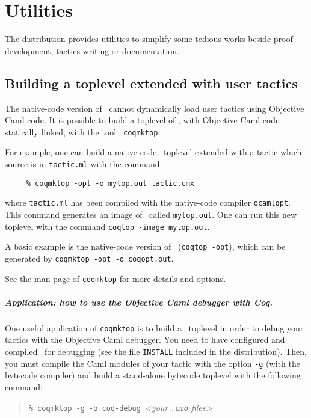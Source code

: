 \chapter{Utilities}\label{Utilities}

The distribution provides utilities to simplify some tedious works
beside proof development, tactics writing or documentation.

\section{Building a toplevel extended with user tactics}
\label{Coqmktop}

The native-code version of \Coq\ cannot dynamically load user tactics
using Objective Caml code. It is possible to build a toplevel of \Coq,
with Objective Caml code statically linked, with the tool {\tt
  coqmktop}.

For example, one can build a native-code \Coq\ toplevel extended with a tactic
which source is in {\tt tactic.ml} with the command 
\begin{verbatim}
     % coqmktop -opt -o mytop.out tactic.cmx
\end{verbatim}
where {\tt tactic.ml} has been compiled with the native-code
compiler {\tt ocamlopt}. This command generates an image of \Coq\ 
called {\tt mytop.out}. One can run this new toplevel with the command
{\tt coqtop -image mytop.out}.

A basic example is the native-code version of \Coq\ ({\tt coqtop
  -opt}), which can be generated by {\tt coqmktop -opt -o coqopt.out}.

See the man page of {\tt coqmktop} for more details and options.


\paragraph{Application: how to use the Objective Caml debugger with Coq.}
\index{Debugger}

One useful application of \texttt{coqmktop} is to build a \Coq\ toplevel in
order to debug your tactics with the Objective Caml debugger.
You need to have configured and compiled \Coq\ for debugging
(see the file \texttt{INSTALL} included in the distribution).
Then, you must compile the Caml modules of your tactic with the
option \texttt{-g} (with the bytecode compiler) and build a stand-alone
bytecode toplevel with the following command:

\begin{quotation}
\texttt{\% coqmktop -g -o coq-debug}~\emph{<your \texttt{.cmo} files>}
\end{quotation}


